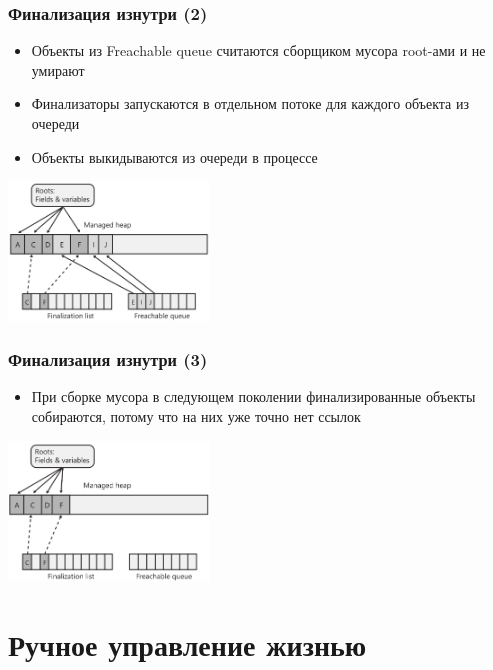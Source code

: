\documentclass[xetex,mathserif,serif]{beamer}
\begin{document}
    \begin{frame}
        \frametitle{Финализация изнутри (2)}
        \begin{itemize}
            \item Объекты из Freachable queue считаются сборщиком мусора root-ами и не умирают
            \item Финализаторы запускаются в отдельном потоке для каждого объекта из очереди
            \item Объекты выкидываются из очереди в процессе
        \end{itemize}
        \begin{center}
            \includegraphics[width=0.4\textwidth]{freachableQueue.png}
        \end{center}
    \end{frame}

    \begin{frame}
        \frametitle{Финализация изнутри (3)}
        \begin{itemize}
            \item При сборке мусора в следующем поколении финализированные объекты собираются, потому что на них уже точно нет ссылок
        \end{itemize}
        \begin{center}
            \includegraphics[width=0.4\textwidth]{finalizationDone.png}
        \end{center}
    \end{frame}

    \section{Ручное управление жизнью}
\end{document}
